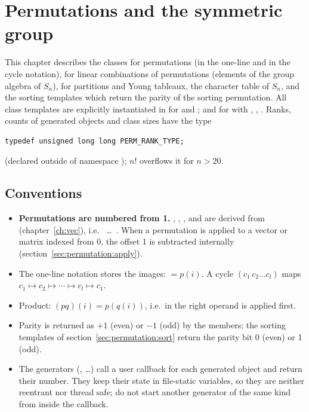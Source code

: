 \chapter{Permutations and the symmetric group}\label{ch:permutation}


This chapter describes the classes for permutations (in the one-line and in the cycle notation),
for linear combinations of permutations (elements of the group algebra of $S_n$), for partitions and
Young tableaux, the character table of $S_n$, and the sorting templates which return the parity of the
sorting permutation. All class templates are explicitly instantiated in  for
 and ;  and 
for  with , , .
Ranks, counts of generated objects and class sizes have the type
\begin{lstlisting}
typedef unsigned long long PERM_RANK_TYPE;
\end{lstlisting}
(declared outside of namespace ); $n!$ overflows it for $n>20$.

\section{Conventions}\label{sec:permutation:conventions}

\begin{itemize}
\item \textbf{Permutations are numbered from 1.} , , ,
	 and  are derived from 
	(chapter~\ref{ch:vec}), i.e.\  \ldots\ . When a permutation is applied to a vector
	or matrix indexed from 0, the offset 1 is subtracted internally (section~\ref{sec:permutation:apply}).
\item The one-line notation stores the images:  $=p(i)$. A cycle $(c_1\,c_2\ldots c_l)$ maps
	$c_1\mapsto c_2\mapsto\cdots\mapsto c_l\mapsto c_1$.
\item Product: $(pq)(i)=p(q(i))$, i.e.\ in  the right operand  is applied first.
\item Parity is returned as $+1$ (even) or $-1$ (odd) by the  members; the sorting
	templates of section~\ref{sec:permutation:sort} return the parity bit 0 (even) or 1 (odd).
\item The generators (, \ldots) call a user callback for each generated object and
	return their number. They keep their state in file-static variables, so they are neither reentrant nor
	thread safe; do not start another generator of the same kind from inside the callback.
\end{itemize}

